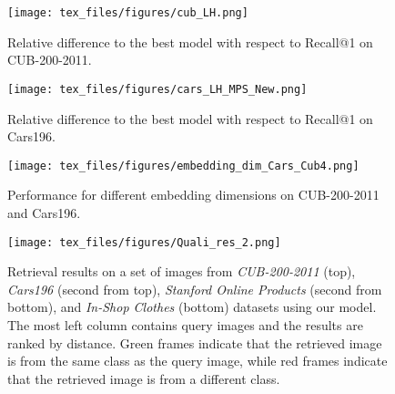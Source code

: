 \documentclass{article}
\begin{document}
\begin{figure*}[thp!]
\centering
\begin{minipage}{.34\textwidth}
  \begin{center}
  \centerline{\texttt{[image: tex\_files/figures/cub\_LH.png]}}
  \caption{Relative difference to the best model with respect to Recall@1 on CUB-200-2011.} \label{fig:cub_LH}
  \end{center}
\end{minipage}\hfill
\hspace{0.01cm}
\begin{minipage}{.34\textwidth}
  \begin{center}
  \centerline{\texttt{[image: tex\_files/figures/cars\_LH\_MPS\_New.png]}}
  \caption{Relative difference to the best \newline model with respect to Recall@1 on Cars196.} \label{fig:cars_LH}
  \end{center}
\end{minipage}\hfill
\begin{minipage}{.31\textwidth}
  \begin{center}
  \centerline{\texttt{[image: tex\_files/figures/embedding\_dim\_Cars\_Cub4.png]}}
  \vspace{0.5cm}
  \caption{Performance for different embedding dimensions on CUB-200-2011 and Cars196.} \label{fig:cars_embed}
  \end{center}
\end{minipage}
\vspace{0.3cm}
\end{figure*}

\begin{figure}[ht!]
\begin{center}
    \centerline{\texttt{[image: tex\_files/figures/Quali\_res\_2.png]}}
\caption{Retrieval results on a set of images from
\textit{CUB-200-2011} (top), \textit{Cars196} (second from top), \textit{Stanford Online Products} (second from bottom), and \textit{In-Shop Clothes} (bottom) datasets using our model. The most left column contains query images and the results are ranked by distance. Green frames indicate that the retrieved image is from the same class as the query image, while red frames indicate that the retrieved image is from a different class.}
\vspace{-1cm}
\label{fig:retrieval_new}
\end{center}
\end{figure}
\end{document}
